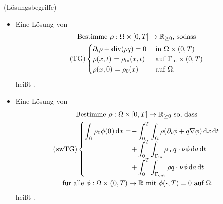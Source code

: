 \begin{define}(Lösungsbegriffe)
	
	\begin{itemize}
		\item Eine Lösung von
		\begin{gather*}
		\text{Bestimme } \rho: \Omega \times [0,T] \to \mathbb{R}_{\geq 0} \text{, sodass}\\
		\operatorname{(TG)}
		\begin{cases}
		\partial_t \rho + \operatorname{div}(\rho q) = 0 &\text{ in } \Omega \times (0,T)\\
		\rho(x,t) = \rho_{\text{in}}(x,t) &\text{ auf } \Gamma_{{\text{in}}} \times (0,T)\\
		\rho(x,0) = \rho_0(x) &\text{ auf } \Omega.
		\end{cases}
		\end{gather*}
		heißt .
		\item Eine Lösung von 
		\begin{gather*} 
		\text{Bestimme } \rho:\Omega\times [0,T] \to \R_{\ge 0} \text{ so, dass}\\
		\swlTG
		\begin{cases}
		\displaystyle
		\int_{\Omega} \rho_0 \phi(0) \diff x = \mkern-16mu &- \displaystyle \int_{0}^{T} \int_{\Omega} \rho (\partial_t \phi + q \nabla \phi ) \diff x \diff t \\
		&+\displaystyle\int_{0}^{T}  \int_{\Gammain} \rhoin q \cdot \nu \phi \diff a  \diff t \\
		&+\displaystyle\int_{0}^{T}  \int_{\Gammaout} \rho q \cdot \nu \phi \diff a  \diff t
		\end{cases}	\\
		\text{ für alle } \phi: \Omega \times (0,T) \to \R \text{ mit } \phi(\cdot,T) = 0 \text{ auf } \Omega.
		\end{gather*}
		heißt .
	\end{itemize}
\end{define}

